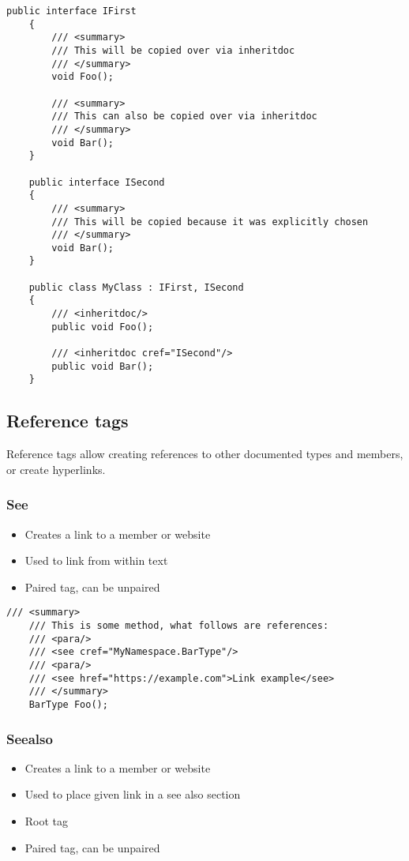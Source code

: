 \begin{lstlisting}[caption=Inheritdoc tag]
    public interface IFirst
    {
        /// <summary>
        /// This will be copied over via inheritdoc
        /// </summary>
        void Foo();

        /// <summary>
        /// This can also be copied over via inheritdoc
        /// </summary>
        void Bar();
    }

    public interface ISecond
    {
        /// <summary>
        /// This will be copied because it was explicitly chosen
        /// </summary>
        void Bar();
    }

    public class MyClass : IFirst, ISecond
    {
        /// <inheritdoc/>
        public void Foo();

        /// <inheritdoc cref="ISecond"/>
        public void Bar();
    }

\end{lstlisting}

\subsection{Reference tags}

Reference tags allow creating references to other documented types and members, or create hyperlinks.

\subsubsection*{See}
\begin{itemize}
    \item Creates a link to a member or website
    \item Used to link from within text
    \item Paired tag, can be unpaired
\end{itemize}

\begin{lstlisting}[caption=See tag]
    /// <summary>
    /// This is some method, what follows are references:
    /// <para/>
    /// <see cref="MyNamespace.BarType"/>
    /// <para/>
    /// <see href="https://example.com">Link example</see>
    /// </summary>
    BarType Foo();
\end{lstlisting}

\subsubsection*{Seealso}
\begin{itemize}
    \item Creates a link to a member or website
    \item Used to place given link in a see also section
    \item Root tag
    \item Paired tag, can be unpaired
\end{itemize}

